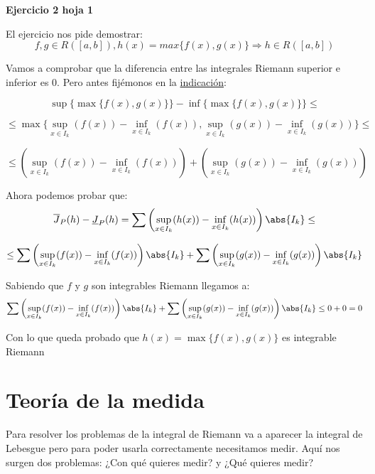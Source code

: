 \documentclass{apuntes}
\begin{document}
\begin{example}
\textbf{Ejercicio 2 hoja 1}

El ejercicio nos pide demostrar:
\[ f,g \in R([a,b]), h(x) = max\lbrace f(x), g(x) \rbrace \Rightarrow h \in R([a,b]) \]

Vamos a comprobar que la diferencia entre las integrales Riemann superior e inferior es 0.
Pero antes fijémonos en la \underline{indicación}:

\newpage
\[\sup\big\{ \max\{f(x), g(x)\}\big\} - \inf\big\{ \max\{f(x), g(x)\} \big\} \leq \]

\[ \leq \max\big\{ \sup_{x \in I_k} (f(x)) - \inf_{x \in I_k} (f(x)), \sup_{x \in I_k} (g(x)) - \inf_{x \in I_k} (g(x)) \big\} \leq \]

\[ \leq \left(\sup_{x \in I_k} (f(x)) - \inf_{x \in I_k} (f(x))\right) + \left(\sup_{x \in I_k} (g(x)) - \inf_{x \in I_k} (g(x))\right) \]


Ahora podemos probar que:
\[\overline{J}_P(h)-\underline{J}_P(h)
= \sum\left(\sup_{x\in I_k}(h(x))-\inf_{x\in I_k}(h(x))\right)\abs{I_k} \leq\]


\[\leq \sum\left( \sup_{x \in I_k} (f(x)) - \inf_{x \in I_k} (f(x)) \right) \abs{I_k} +
 \sum\left( \sup_{x \in I_k} (g(x)) - \inf_{x \in I_k} (g(x)) \right) \abs{I_k} \]

Sabiendo que $f$ y $g$ son integrables Riemann llegamos a:
\[\sum\left( \sup_{x \in I_k} (f(x)) - \inf_{x \in I_k} (f(x)) \right) \abs{I_k} +
 \sum\left( \sup_{x \in I_k} (g(x)) - \inf_{x \in I_k} (g(x)) \right) \abs{I_k} \leq 0 + 0 = 0\]

 Con lo que queda probado que $h(x) = \max\lbrace f(x), g(x) \rbrace$ es integrable Riemann

\end{example}

\chapter{Teoría de la medida}
Para resolver los problemas de la integral de Riemann va a aparecer la integral de Lebesgue pero para poder usarla correctamente necesitamos medir. Aquí nos surgen dos problemas: ¿Con qué quieres medir? y ¿Qué quieres medir?
\end{document}
